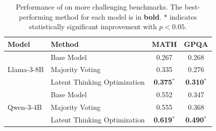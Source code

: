 \begin{table}[t]
\centering
\small
\newcommand{\supscriptspace}{\makebox[\widthof{$^{*}$}]{}} 
\setlength{\tabcolsep}{4pt}
\caption{Performance of \LTO on more challenging benchmarks. The best-performing method for each model is in \textbf{bold}. $*$ indicates statistically significant improvement with $p<0.05$.}
\begin{tabular}{llcc}
\toprule
\textbf{Model} & \textbf{Method} & \textbf{MATH} & \textbf{GPQA} \\
\midrule

\multirow{3}{*}{Llama-3-8B}
& Base Model                   & 0.267 & 0.268 \\
& Majority Voting              & 0.335 & 0.276 \\
& Latent Thinking Optimization 
& \supscriptspace\textbf{0.375}$^{*}$ & \supscriptspace\textbf{0.310}$^{*}$ \\
\midrule

\multirow{3}{*}{Qwen-3-4B}
& Base Model                   & 0.552 & 0.347 \\
& Majority Voting              & 0.555 & 0.368 \\
& Latent Thinking Optimization 
& \supscriptspace\textbf{0.619}$^{*}$ & \supscriptspace\textbf{0.490}$^{*}$ \\
\bottomrule
\end{tabular}
\label{tab:challenging_benchmarks}
\end{table}
